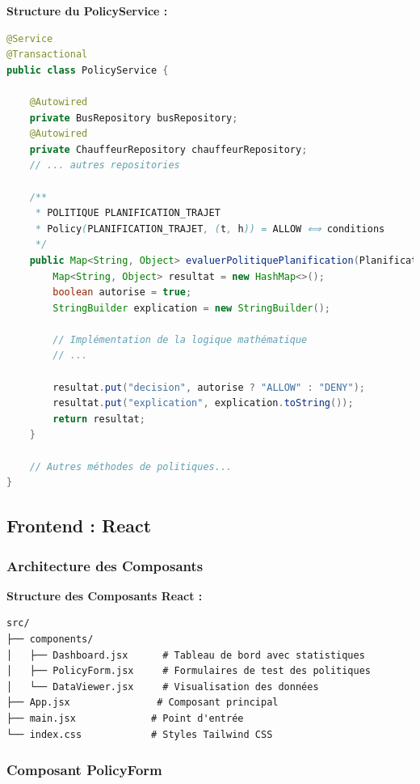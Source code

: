 \documentclass[12pt,a4paper]{article}
\begin{document}
    \begin{codebox}
        \textbf{Structure du PolicyService :}
        \begin{lstlisting}[language=Java]
@Service
@Transactional
public class PolicyService {

    @Autowired
    private BusRepository busRepository;
    @Autowired
    private ChauffeurRepository chauffeurRepository;
    // ... autres repositories

    /**
     * POLITIQUE PLANIFICATION_TRAJET
     * Policy(PLANIFICATION_TRAJET, (t, h)) = ALLOW ⟺ conditions
     */
    public Map<String, Object> evaluerPolitiquePlanification(PlanificationRequest request) {
        Map<String, Object> resultat = new HashMap<>();
        boolean autorise = true;
        StringBuilder explication = new StringBuilder();

        // Implémentation de la logique mathématique
        // ...

        resultat.put("decision", autorise ? "ALLOW" : "DENY");
        resultat.put("explication", explication.toString());
        return resultat;
    }

    // Autres méthodes de politiques...
}
        \end{lstlisting}
    \end{codebox}

    \subsection{Frontend : React}

    \subsubsection{Architecture des Composants}

    \begin{codebox}
        \textbf{Structure des Composants React :}
        \begin{lstlisting}
src/
├── components/
│   ├── Dashboard.jsx      # Tableau de bord avec statistiques
│   ├── PolicyForm.jsx     # Formulaires de test des politiques
│   └── DataViewer.jsx     # Visualisation des données
├── App.jsx               # Composant principal
├── main.jsx             # Point d'entrée
└── index.css            # Styles Tailwind CSS
        \end{lstlisting}
    \end{codebox}

    \subsubsection{Composant PolicyForm}
\end{document}
